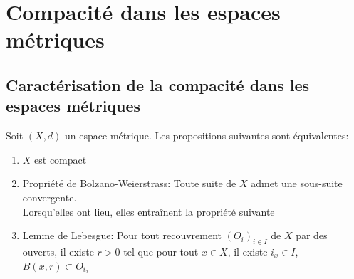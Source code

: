 \documentclass[]{report}
\begin{document}
    \section{Compacité dans les espaces métriques}

    \subsection*{Caractérisation de la compacité dans les espaces métriques}

    \begin{tm}{}{}
        Soit $(X,d)$ un espace métrique. Les propositions suivantes sont équivalentes:
        \begin{enumerate}
            \item $X$ est compact
            \item Propriété de Bolzano-Weierstrass: Toute suite de $X$ admet une sous-suite convergente.\\
            Lorsqu'elles ont lieu, elles entraînent la propriété suivante
            \item Lemme de Lebesgue: Pour tout recouvrement $(O_i)_{i\in I}$ de $X$ par des ouverts, il existe $r>0$ tel que pour tout $x\in X$, il existe $i_x\in I$, $B(x,r)\subset O_{i_x}$        \end{enumerate}
    \end{tm}
\end{document}
